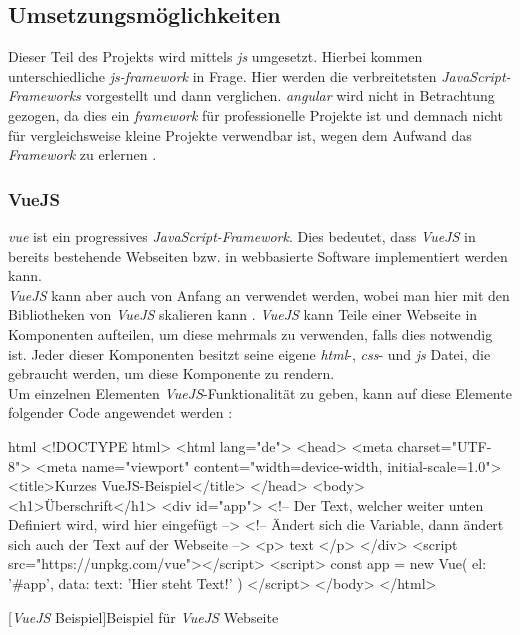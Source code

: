 \subsection{Umsetzungsmöglichkeiten}
Dieser Teil des Projekts wird mittels \textit{\Gls{js}} umgesetzt. Hierbei kommen unterschiedliche \textit{\Gls{js}-\Gls{framework}} in Frage. Hier werden die verbreitetsten \textit{JavaScript-Frameworks} vorgestellt und dann verglichen. \textit{\Gls{angular}} wird nicht in Betrachtung gezogen, da dies ein \textit{\Gls{framework}} für professionelle Projekte ist und demnach nicht für vergleichsweise kleine Projekte verwendbar ist, wegen dem Aufwand das \textit{Framework} zu erlernen \cite{angular_ex}.
\subsubsection{VueJS}
\textit{\Gls{vue}} ist ein progressives \textit{JavaScript-Framework}. Dies bedeutet, dass \textit{VueJS} in bereits bestehende Webseiten bzw. in webbasierte Software implementiert werden kann.\\
\textit{VueJS} kann aber auch von Anfang an verwendet werden, wobei man hier mit den Bibliotheken von \textit{VueJS} skalieren kann \cite{vuedoc}. \textit{VueJS} kann Teile einer Webseite in Komponenten aufteilen, um diese mehrmals zu verwenden, falls dies notwendig ist. Jeder dieser Komponenten besitzt seine eigene \textit{\Gls{html}}-, \textit{\Gls{css}}- und \textit{\Gls{js}} Datei, die gebraucht werden, um diese Komponente zu rendern.\\
Um einzelnen Elementen \textit{VueJS}-Funktionalität zu geben, kann auf diese Elemente folgender Code angewendet werden \cite{vuedoc}:
\begin{code}{html}
	<!DOCTYPE html>
	<html lang="de">
		<head>
			<meta charset="UTF-8">
			<meta name="viewport" content="width=device-width, initial-scale=1.0">
			<title>Kurzes VueJS-Beispiel</title>
		</head>
		<body>
			<h1>Überschrift</h1>
			<div id="app">
				<!-- Der Text, welcher weiter unten Definiert wird, wird hier eingefügt -->
				<!-- Ändert sich die Variable, dann ändert sich auch der Text auf der Webseite -->
				<p> {{ text }} </p>
			</div>
			<script src="https://unpkg.com/vue"></script>
			<script>
				const app = new Vue({
					el: '#app',
					data: {
						text: 'Hier steht Text!'
					}
				})
			</script>
		</body>
	</html>
\end{code}
[\textit{VueJS} Beispiel]{Beispiel für \textit{VueJS} Webseite}~\\
